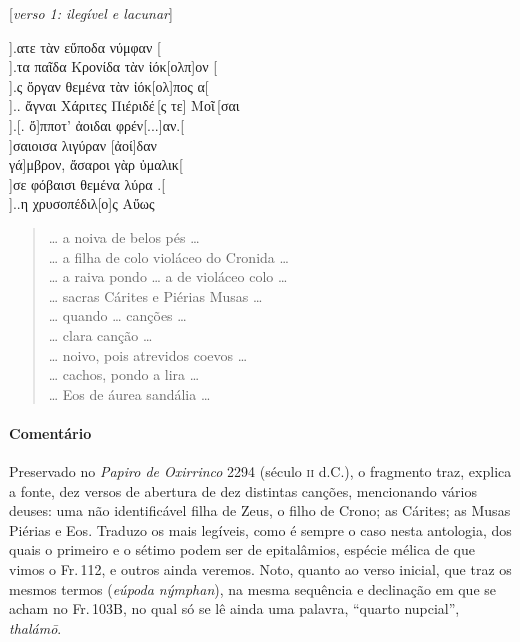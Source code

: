 \begin{gkverse}
\textnormal{[\textit{verso 1: ilegível e lacunar}]}

].ατε τὰν εὔποδα νύμφαν [\\[8pt]
].τα παῖδα Κρονίδα τὰν ἰόκ[ολπ]ον [\\[8pt]
].ς ὄργαν θεμένα τὰν ἰόκ[ολ]πος α[\\[8pt]
 ].. ἄγναι Χάριτες Πιέριδέ\,[ς τε] Μοῖ\,[σαι\\[8pt]
     ].[. ὄ]πποτ’ ἀοιδαι φρέν[...]αν.[\\[8pt]
             ]σαιοισα λιγύραν [ἀοί]δαν\\[8pt]
         γά]μβρον, ἄσαροι γὰρ ὐμαλικ[\\[8pt]
  ]σε φόβαισι θεμένα λύρα .[\\[8pt]
  ]..η χρυσοπέδιλ[ο]ς Αὔως
\end{gkverse}

\begin{verse}
\ldots{} a noiva de belos pés \ldots{}\\[8pt]
\ldots{} a filha de colo violáceo do Cronida \ldots{}\\[8pt]
\ldots{} a raiva pondo \ldots{} a de violáceo colo \ldots{}\\[8pt]
\ldots{} sacras Cárites e Piérias Musas \ldots{}\\[8pt]
\ldots{} quando \ldots{} canções \ldots{}\\[8pt]
\ldots{} clara canção \ldots{}\\[8pt]
\ldots{} noivo, pois atrevidos coevos \ldots{}\\[8pt]
\ldots{} cachos, pondo a lira \ldots{}\\[8pt]
\ldots{} Eos de áurea sandália \ldots{}\\[8pt]
\end{verse}

\medskip

{\paragraph{Comentário} Preservado  no \textit{Papiro de Oxirrinco} 2294 (século \textsc{ii} d.C.), o fragmento traz, explica a fonte, dez versos de abertura de dez distintas canções, mencionando vários deuses: uma não identificável filha de Zeus, o filho de Crono; as Cárites; as Musas Piérias e Eos. Traduzo os mais legíveis, como é sempre o caso nesta antologia, dos quais o primeiro e o sétimo podem ser de epitalâmios, espécie mélica de que vimos o Fr.\,112, e outros ainda veremos.
Noto, quanto ao verso inicial, que traz os mesmos termos (\textit{eúpoda nýmphan}), na mesma sequência e declinação em que se acham no Fr.\,103B, no qual só se lê ainda uma palavra, ``quarto nupcial'', \textit{thalámō}.}


